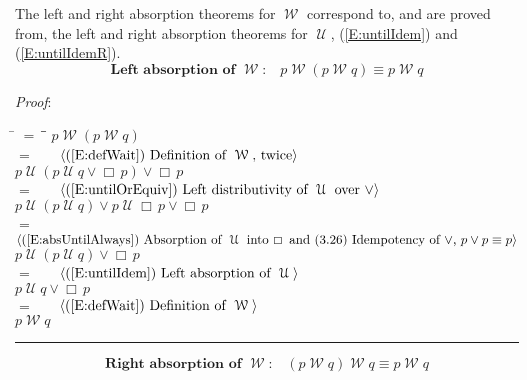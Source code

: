 \documentclass[12pt, fleqn, leqno]{article}
\newcommand{\lgap}{2pt}                             %
\newcommand{\mymathindent}{24pt}                    %
\newcommand{\Until}{\;\mathcal{U}\;}
\newcommand{\Wait}{\;\mathcal{W}\;}
\newcommand{\Always}{\Box\,}
\newcommand{\myqed}{\rule[-.23ex]{1.2ex}{2.0ex}}
\newcommand{\myqedtab}{\hspace{384pt}}              %
\newcommand{\Gll} {\langle}                         %
\newcommand{\Ggg} {\rangle}                         %
\newcommand{\Hint}[1]     {\ \ \ $\Gll              \mbox{#1} \Ggg$ }   %
\begin{document}
The left and right absorption theorems for $\Wait$ correspond to, and are proved from, the left and right absorption theorems
for $\Until$, (\ref{E:untilIdem}) and (\ref{E:untilIdemR}).
\begin{equation}\label{E:waitAbsL}
\textbf{Left absorption of $\Wait$:}\quad p \Wait (p \Wait q) \equiv p \Wait q
\end{equation}

\emph{Proof}:
\begin{tabbing}
\hspace{\mymathindent} \= $= \;$ \= \myqedtab \= \kill
  \> \>   $p \Wait (p \Wait q)$\\[\lgap]
\> $=$ \> \Hint{(\ref{E:defWait}) Definition of $\Wait$, twice} \\[\lgap]
  \> \>   $p \Until (p \Until q \lor \Always p) \lor \Always p$\\[\lgap]
  \> $=$  \>  \Hint{(\ref{E:untilOrEquiv}) Left distributivity of $\Until$ over $\lor$}\\[\lgap]
  \> \>   $p \Until (p \Until q) \lor p\Until \Always p \lor \Always p$\\[\lgap]
  \> $=$  \>  \Hint{(\ref{E:absUntilAlways}) Absorption of $\Until$ into $\Always$ and (3.26) Idempotency of $\lor$, $p\lor p \equiv p$}\\[\lgap]
  \> \>   $p \Until (p \Until q) \lor \Always p$\\[\lgap]
  \> $=$  \>  \Hint{(\ref{E:untilIdem}) Left absorption of $\Until$}\\[\lgap]
  \> \>   $p \Until q \lor \Always p$\\[\lgap]
\> $=$ \> \Hint{(\ref{E:defWait}) Definition of $\Wait$} \\[\lgap]
  \> \>   $p \Wait q$ \quad \myqed
\end{tabbing}
\begin{equation}\label{E:waitAbsR}
\textbf{Right absorption of $\Wait$:}\quad (p \Wait q) \Wait q \equiv p \Wait q
\end{equation}
\end{document}
